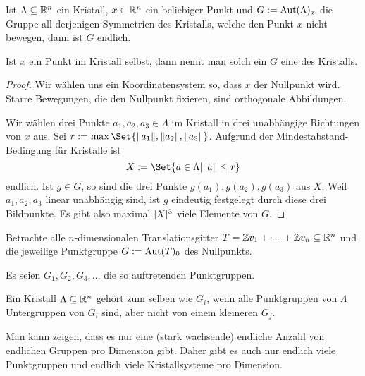 \begin{lemmadef}[Punktgruppen]
Ist $\Lambda\subseteq\mathbb{R}^n$ ein Kristall, $x\in\mathbb{R}^n$ ein beliebiger Punkt und $G:=\operatorname{Aut}(\Lambda)_x$ die Gruppe all derjenigen Symmetrien des Kristalls, welche den Punkt $x$ nicht bewegen, dann ist $G$ endlich.

Ist $x$ ein Punkt im Kristall selbst, dann nennt man solch ein $G$ eine  des Kristalls.
\end{lemmadef}
\begin{proof}
Wir wählen uns ein Koordinatensystem so, dass $x$ der Nullpunkt wird. Starre Bewegungen, die den Nullpunkt fixieren, sind orthogonale Abbildungen.

Wir wählen drei Punkte $a_1,a_2,a_3\in\Lambda$ im Kristall in drei unabhängige Richtungen von $x$ aus. Sei $r:=\max\Set{\norm{a_1},\norm{a_2},\norm{a_3}}$. Aufgrund der Mindestabstand-Bedingung für Kristalle ist
\[X:=\Set{a\in\Lambda | \norm{a}\leq r}\]
endlich. Ist $g\in G$, so sind die drei Punkte $g(a_1),g(a_2),g(a_3)$ aus $X$. Weil $a_1,a_2,a_3$ linear unabhängig sind, ist $g$ eindeutig festgelegt durch diese drei Bildpunkte. Es gibt also maximal $\lvert X\rvert^3$ viele Elemente von $G$.
\end{proof}

\begin{definition}[Kristallsysteme]
Betrachte alle $n$-dimensionalen Translationsgitter $T=\mathbb{Z} v_1+\cdots+\mathbb{Z} v_n\subseteq\mathbb{R}^n$ und die jeweilige Punktgruppe $G:=\operatorname{Aut}(T)_0$ des Nullpunkts.

Es seien $G_1, G_2, G_3, \ldots$ die so auftretenden Punktgruppen.

Ein Kristall $\Lambda\subseteq\mathbb{R}^n$ gehört zum selben  wie $G_i$, wenn alle Punktgruppen von $\Lambda$ Untergruppen von $G_i$ sind, aber nicht von einem kleineren $G_j$.
\end{definition}

\begin{remark}
Man kann zeigen, dass es nur eine (stark wachsende) endliche Anzahl von endlichen Gruppen pro Dimension gibt. Daher gibt es auch nur endlich viele Punktgruppen und endlich viele Kristallsysteme pro Dimension.
\end{remark}

